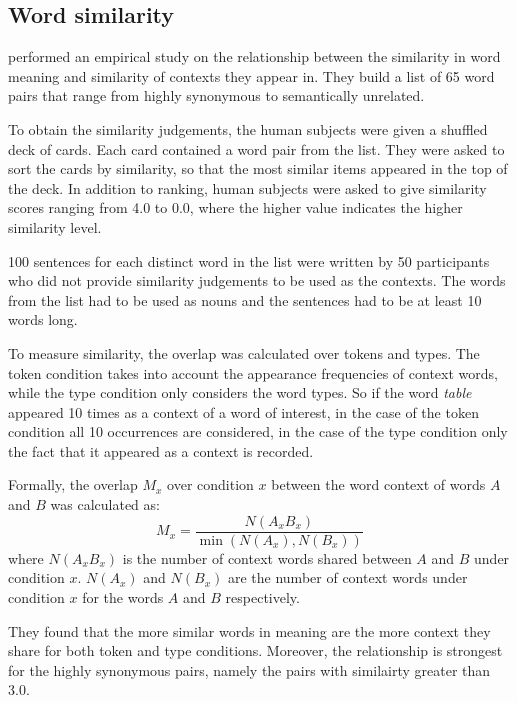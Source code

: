 \subsection{Word similarity}
\label{sec:lexical-similarity}

 performed an empirical study on the relationship between the similarity in word meaning and similarity of contexts they appear in. They build a list of 65 word pairs that range from highly synonymous to semantically unrelated.

To obtain the similarity judgements, the human subjects were given a shuffled deck of cards. Each card contained a word pair from the list. They were asked to sort the cards by similarity, so that the most similar items appeared in the top of the deck. In addition to ranking, human subjects were asked to give similarity scores ranging from 4.0 to 0.0, where the higher value indicates the higher similarity level.

100 sentences for each distinct word in the list were written by 50 participants who did not provide similarity judgements to be used as the contexts. The words from the list had to be used as nouns and the sentences had to be at least 10 words long.

To measure similarity, the overlap was calculated over tokens and types. The token condition takes into account the appearance frequencies of context words, while the type condition only considers the word types. So if the word \textit{table} appeared 10 times as a context of a word of interest, in the case of the token condition all 10 occurrences are considered, in the case of the type condition only the fact that it appeared as a context is recorded.

Formally, the overlap $M_x$ over condition $x$ between the word context of words $A$ and $B$ was calculated as:
%
\begin{equation*}
  M_x = \frac{N(A_xB_x)}{\min(N(A_x), N(B_x))}
\end{equation*}
%
where $N(A_xB_x)$ is the number of context words shared between $A$ and $B$ under condition $x$. $N(A_x)$ and $N(B_x)$ are the number of context words under condition $x$ for the words $A$ and $B$ respectively.

They found that the more similar words in meaning are the more context they share for both token and type conditions. Moreover, the relationship is strongest for the highly synonymous pairs, namely the pairs with similairty greater than 3.0.


